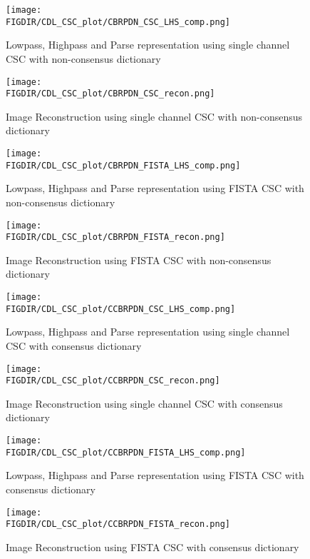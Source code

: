 \begin{figure}
\centering
\texttt{[image: \\FIGDIR/CDL\_CSC\_plot/CBRPDN\_CSC\_LHS\_comp.png]}
\caption{Lowpass, Highpass and Parse representation using single channel CSC with non-consensus dictionary}
\label{fig_CBRPDN_CSC_LHS_comp}
\end{figure}

\begin{figure}
\centering
\texttt{[image: \\FIGDIR/CDL\_CSC\_plot/CBRPDN\_CSC\_recon.png]}
\caption{Image Reconstruction using single channel CSC with non-consensus dictionary}
\label{fig_CBRPDN_CSC_recon}
\end{figure}

\begin{figure}
\centering
\texttt{[image: \\FIGDIR/CDL\_CSC\_plot/CBRPDN\_FISTA\_LHS\_comp.png]}
\caption{Lowpass, Highpass and Parse representation using FISTA CSC with non-consensus dictionary}
\label{fig_CBRPDN_FISTA_LHS_comp}
\end{figure}

\begin{figure}
\centering
\texttt{[image: \\FIGDIR/CDL\_CSC\_plot/CBRPDN\_FISTA\_recon.png]}
\caption{Image Reconstruction using FISTA CSC with non-consensus dictionary}
\label{fig_CBRPDN_FISTA_recon}
\end{figure}

\begin{figure}
\centering
\texttt{[image: \\FIGDIR/CDL\_CSC\_plot/CCBRPDN\_CSC\_LHS\_comp.png]}
\caption{Lowpass, Highpass and Parse representation using single channel CSC with consensus dictionary}
\label{fig_CCBRPDN_CSC_LHS_comp}
\end{figure}

\begin{figure}
\centering
\texttt{[image: \\FIGDIR/CDL\_CSC\_plot/CCBRPDN\_CSC\_recon.png]}
\caption{Image Reconstruction using single channel CSC with consensus dictionary}
\label{fig_CCBRPDN_CSC_recon}
\end{figure}

\begin{figure}
\centering
\texttt{[image: \\FIGDIR/CDL\_CSC\_plot/CCBRPDN\_FISTA\_LHS\_comp.png]}
\caption{Lowpass, Highpass and Parse representation using FISTA CSC with consensus dictionary}
\label{fig_CCBRPDN_FISTA_LHS_comp}
\end{figure}

\begin{figure}
\centering
\texttt{[image: \\FIGDIR/CDL\_CSC\_plot/CCBRPDN\_FISTA\_recon.png]}
\caption{Image Reconstruction using FISTA CSC with consensus dictionary}
\label{fig_CCBRPDN_FISTA_recon}
\end{figure}

